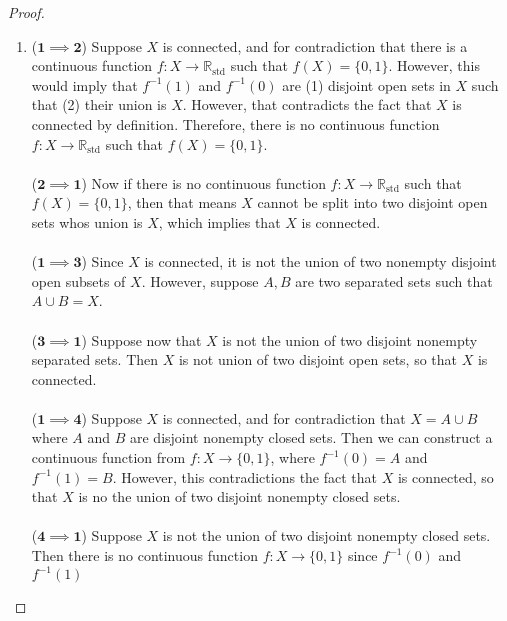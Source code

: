 \documentclass[a4paper,12pt,twoside]{hmcpset}
\begin{document}
\begin{proof}
    \begin{enumerate}
        \item[] ($\mathbf{1 \implies 2}$) Suppose $X$ is connected,
        and for contradiction that there is a continuous function $f:
        X \rightarrow \mathbb{R}_{\text{std}}$ such that $f(X) = \{0,
        1\}$. However, this would imply that $f^{-1}(1)$ and
        $f^{-1}(0)$ are (1) disjoint open sets in $X$ such that (2)
        their union is $X$. However, that contradicts the fact that
        $X$ is connected by definition. Therefore, there is no
        continuous function $f:
        X \rightarrow \mathbb{R}_{\text{std}}$ such that $f(X) = \{0,
        1\}$.
        \\
        \\
        ($\mathbf{2 \implies 1}$) Now if there is no continuous
        function $f:
        X \rightarrow \mathbb{R}_{\text{std}}$ such that $f(X) = \{0,
        1\}$, then that means $X$ cannot be split into two disjoint
        open sets whos union is $X$, which implies that $X$ is
        connected.
        \\
        \\
        ($\mathbf{1 \implies 3}$) Since $X$ is connected, it is not
        the union of two nonempty disjoint open subsets of $X$.
        However, suppose $A, B$ are two separated sets such that $A
        \cup B = X$.
        \\
        \\
        ($\mathbf{3 \implies 1}$) Suppose now that $X$ is not the
        union of two disjoint nonempty separated sets. Then $X$ is not
        union of two disjoint open sets, so that $X$ is connected. 
        \\
        \\
        ($\mathbf{1 \implies 4}$) Suppose $X$ is connected, and for
        contradiction that $X = A \cup B$ where $A$ and $B$ are
        disjoint nonempty closed
        sets. Then we can construct a continuous function from $f: X
        \to \{0, 1\}$, where $f^{-1}(0) = A$ and $f^{-1}(1) = B$.
        However, this contradictions the fact that $X$ is connected,
        so that $X$ is no the union of two disjoint nonempty closed
        sets. 
        \\
        \\
        ($\mathbf{4 \implies 1}$) Suppose $X$ is not the union of two
        disjoint nonempty closed sets. Then there is no continuous
        function $f: X \to \{0, 1\}$ since $f^{-1}(0)$ and $f^{-1}(1)$

\end{enumerate}
\end{proof}
\end{document}
